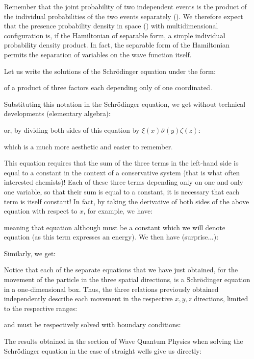 	Remember that the joint probability of two independent events is the product of the individual probabilities of the two events separately (). We therefore expect that the presence probability density in space () with multidimensional configuration is, if the Hamiltonian of separable form, a simple individual probability density product. In fact, the separable form of the Hamiltonian permits the separation of variables on the wave function itself.

	Let us write the solutions of the Schrödinger equation under the form:
	
	of a product of three factors each depending only of one coordinated.

	Substituting this notation in the Schrödinger equation, we get without technical developments (elementary algebra):
	
	or, by dividing both sides of this equation by $\xi(x)\vartheta(y)\zeta(z)$:
	
	which is a much more aesthetic and easier to remember.
	
	This equation requires that the sum of the three terms in the left-hand side is equal to a constant in the context of a conservative system (that is what often interested chemists)! Each of these three terms depending only on one and only one variable, so that their sum is equal to a constant, it is necessary that each term is itself constant! In fact, by taking the derivative of both sides of the above equation with respect to $x$, for example, we have:
	
	meaning that equation although  must be a constant which we will denote equation (as this term expresses an energy). We then have (surprise...):
	
	Similarly, we get:
	
	Notice that each of the separate equations that we have just obtained, for the movement of the particle in the three spatial directions, is a Schrödinger equation in a one-dimensional box. Thus, the three relations previously obtained independently describe each movement in the respective $x, y, z$ directions, limited to the respective ranges:
	
	and must be respectively  solved with boundary conditions:
	
	The results obtained in the section of Wave Quantum Physics when solving the Schrödinger equation in the case of straight wells give us directly:
	
